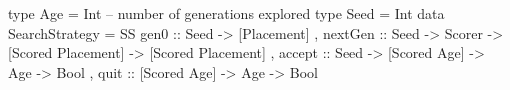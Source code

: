 type Age  = Int -- number of generations explored
type Seed = Int
data SearchStrategy = 
 SS { gen0    :: Seed -> [Placement]
    , nextGen :: Seed -> Scorer 
              -> [Scored Placement] -> [Scored Placement]
    , accept  :: Seed -> [Scored Age] -> Age -> Bool
    , quit    ::         [Scored Age] -> Age -> Bool
    }
